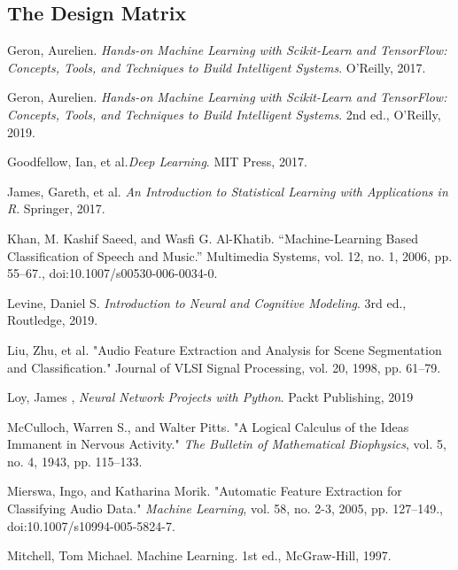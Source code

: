 \documentclass[12pt,letterpaper]{article}
\begin{document}
\subsection{The Design Matrix}



\newpage

\begin{thebibliography}{9}


Geron, Aurelien. \textit{Hands-on Machine Learning with Scikit-Learn and TensorFlow: Concepts, Tools, and Techniques to Build Intelligent Systems}. O'Reilly, 2017.

Geron, Aurelien. \textit{Hands-on Machine Learning with Scikit-Learn and TensorFlow: Concepts, Tools, and Techniques to Build Intelligent Systems}. 2nd ed., O'Reilly, 2019.

Goodfellow, Ian, et al.\textit{Deep Learning}. MIT Press, 2017.

James, Gareth, et al. \textit{An Introduction to Statistical Learning with Applications in R}. Springer, 2017.

Khan, M. Kashif Saeed, and Wasfi G. Al-Khatib. “Machine-Learning Based Classification of Speech and Music.” Multimedia Systems, vol. 12, no. 1, 2006, pp. 55–67., doi:10.1007/s00530-006-0034-0.

Levine, Daniel S. \textit{Introduction to Neural and Cognitive Modeling}. 3rd ed., Routledge, 2019.

Liu, Zhu, et al. "Audio Feature Extraction and Analysis for Scene Segmentation and Classification." Journal of VLSI Signal Processing, vol. 20, 1998, pp. 61–79.

Loy, James , \textit{Neural Network Projects with Python}. Packt Publishing, 2019

McCulloch, Warren S., and Walter Pitts. "A Logical Calculus of the Ideas Immanent in Nervous Activity." \textit{The Bulletin of Mathematical Biophysics}, vol. 5, no. 4, 1943, pp. 115–133.

Mierswa, Ingo, and Katharina Morik. "Automatic Feature Extraction for Classifying Audio Data." \textit{Machine Learning}, vol. 58, no. 2-3, 2005, pp. 127–149., doi:10.1007/s10994-005-5824-7.

Mitchell, Tom Michael. Machine Learning. 1st ed., McGraw-Hill, 1997.


\end{thebibliography}
\end{document}
